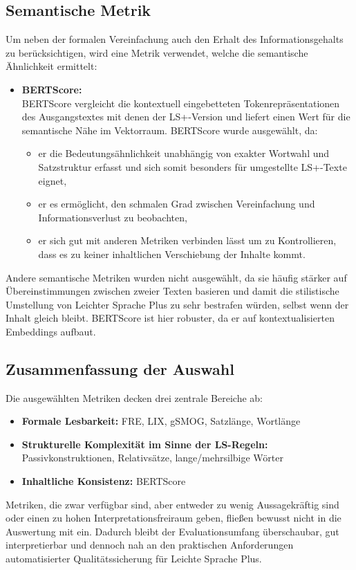 \subsection{Semantische Metrik}
Um neben der formalen Vereinfachung auch den Erhalt des Informationsgehalts zu berücksichtigen, wird eine Metrik verwendet, welche die semantische Ähnlichkeit ermittelt:
\begin{itemize}
	\item \textbf{BERTScore:}\\
	BERTScore vergleicht die kontextuell eingebetteten Tokenrepräsentationen des Ausgangstextes mit denen der LS+-Version und liefert einen Wert für die semantische Nähe im Vektorraum.
	BERTScore wurde ausgewählt, da:
	\begin{itemize}
		\item er die Bedeutungsähnlichkeit unabhängig von exakter Wortwahl und Satzstruktur erfasst und sich somit besonders für umgestellte LS+-Texte eignet,
		\item er es ermöglicht, den schmalen Grad zwischen Vereinfachung und Informationsverlust zu beobachten,
		\item er sich gut mit anderen Metriken verbinden lässt um zu Kontrollieren, dass es zu keiner inhaltlichen Verschiebung der Inhalte kommt.
	\end{itemize}
\end{itemize}
Andere semantische Metriken wurden nicht ausgewählt, da sie häufig stärker auf Übereinstimmungen zwischen zweier Texten basieren und damit die stilistische Umstellung von Leichter Sprache Plus zu sehr bestrafen würden, selbst wenn der Inhalt gleich bleibt.
BERTScore ist hier robuster, da er auf kontextualisierten Embeddings aufbaut.

\subsection{Zusammenfassung der Auswahl}
Die ausgewählten Metriken decken drei zentrale Bereiche ab:
\begin{itemize}
	\item \textbf{Formale Lesbarkeit:} FRE, LIX, gSMOG, Satzlänge, Wortlänge
	\item \textbf{Strukturelle Komplexität im Sinne der LS-Regeln:} Passivkonstruktionen, Relativsätze, lange/mehrsilbige Wörter
	\item \textbf{Inhaltliche Konsistenz:} BERTScore
\end{itemize}
Metriken, die zwar verfügbar sind, aber entweder zu wenig Aussagekräftig sind oder einen zu hohen Interpretationsfreiraum geben, fließen bewusst nicht in die Auswertung mit ein.
Dadurch bleibt der Evaluationsumfang überschaubar, gut interpretierbar und dennoch nah an den praktischen Anforderungen automatisierter Qualitätssicherung für Leichte Sprache Plus.